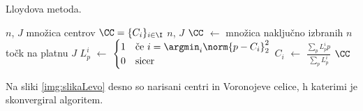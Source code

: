 %
\begin{algorithm}[htb]
  \caption{Lloydova metoda.}
  \label{alg:Lloyd}
\begin{algorithmic}[1]
\Require $n$, $J$
\Ensure množica centrov $\CC = \{C_i\}_{i \in \I}$
 {$n$, $J$}
  \State $\CC$ $\gets$ množica naključno izbranih $n$ točk na platnu $J$
    \State $L_p^i$ $\gets$
             $\begin{cases}
               1 &\mbox{če } i = \argmin_i\norm{p - C_i}_2^2\\
               0 & \mbox{sicer}
              \end{cases}$
    \State $C_i$ $\gets$ $\frac{\sum_p L_p^i p}{\sum_p L_p^i}$
  \EndWhile
  \State \Return $\CC$
\EndFunction
\end{algorithmic}
\end{algorithm}
%

Na sliki \ref{img:slikaLevo} desno so narisani centri in Voronojeve celice, h katerimi je skonvergiral algoritem.
